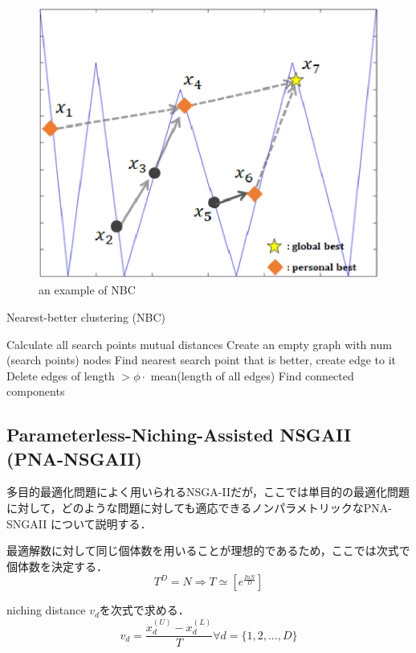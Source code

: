 \documentclass[a4j,11pt]{jarticle}
\begin{document}
\begin{figure}[t]
\centering
\includegraphics[width=0.8\linewidth]{eps/nbc.eps}
\caption{an example of NBC}
\label{fig:nbc}
\end{figure}

\begin{algorithm}[H]
\caption{Nearest-better clustering (NBC)}
\label{code:nbc}
\begin{algorithmic}[3]
\STATE Calculate all search points mutual distances
\STATE Create an empty graph with num (search points) nodes
\STATE Find nearest search point that is better, create edge to it
\ENDFOR
\STATE Delete edges of length $> \phi \cdot$ mean(length of all edges)
\STATE Find connected components 
\end{algorithmic}
\end{algorithm}

\subsection{Parameterless-Niching-Assisted NSGAII (PNA-NSGAII)}
\label{ss:PNA-NSGA}
多目的最適化問題によく用いられるNSGA-IIだが，ここでは単目的の最適化問題に対して，どのような問題に対しても適応できるノンパラメトリックなPNA-SNGAII \cite{PNA-NSGA}について説明する．

最適解数に対して同じ個体数を用いることが理想的であるため，ここでは次式で個体数を決定する．
\begin{equation}
T^D=N \Rightarrow T \simeq [e^{\frac{InN}{D}}]
\end{equation}

niching distance $v_d$を次式で求める．
\begin{equation}
v_d=\frac{x_d^{(U)}-x_d^{(L)}}{T} \forall d=\{ 1,2,...,D\}
\end{equation}
\end{document}
